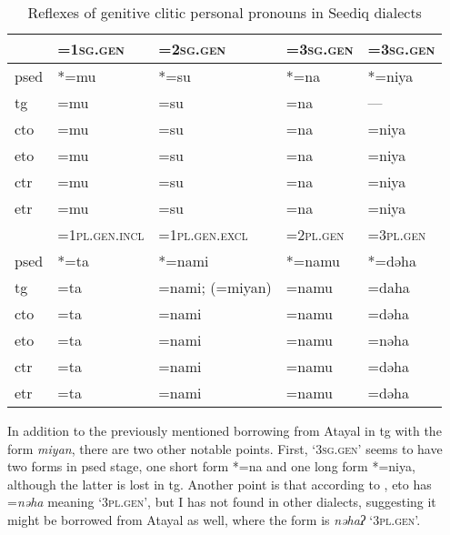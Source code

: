 \begin{table}[!htbp]
\centering
\caption{Reflexes of genitive clitic personal pronouns in Seediq dialects}
\label{tab:genclitic}
\begin{tabular}{lllll}
\hline
      & =\textsc{1sg.gen}      & =\textsc{2sg.gen}        & =\textsc{3sg.gen} & =\textsc{3sg.gen}       \\ \hline
\acs{psed} & *=mu          & *=su            & *=na     & *=niya         \\
\acs{tg}  & =mu           & =su             & =na      & ---            \\
\acs{cto}  & =mu           & =su             & =na      & =niya          \\
\acs{eto}  & =mu           & =su             & =na      & =niya          \\
\acs{ctr} & =mu           & =su             & =na      & =niya          \\
\acs{etr} & =mu           & =su             & =na      & =niya          \\ \hline
      & =\textsc{1pl.gen.incl} & =\textsc{1pl.gen.excl}   & =\textsc{2pl.gen} & =\textsc{3pl.gen}       \\ \hline
\acs{psed} & *=ta          & *=nami          & *=namu   & *=dəha         \\
\acs{tg}  & =ta           & =nami; (=miyan) & =namu    & =daha          \\
\acs{cto}  & =ta           & =nami           & =namu    & =dəha          \\
\acs{eto}  & =ta           & =nami           & =namu    & =nəha          \\
\acs{ctr} & =ta           & =nami           & =namu    & =dəha          \\
\acs{etr} & =ta           & =nami           & =namu    & =dəha     \\ \hline
\end{tabular}
\end{table}

In addition to the previously mentioned borrowing from Atayal in \acl{tg} with the form \textit{miyan}, there are two other notable points. First, `\textsc{3sg.gen}' seems to have two forms in \acl{psed} stage, one short form *=na and one long form *=niya, although the latter is lost in \acl{tg}. Another point is that according to \textcite{lee2015tawsa}, \acl{eto} has =\textit{nəha} meaning `\textsc{3pl.gen}', but I has not found in other dialects, suggesting it might be borrowed from Atayal as well, where the form is \textit{nəhaʔ} `\textsc{3pl.gen}'.

